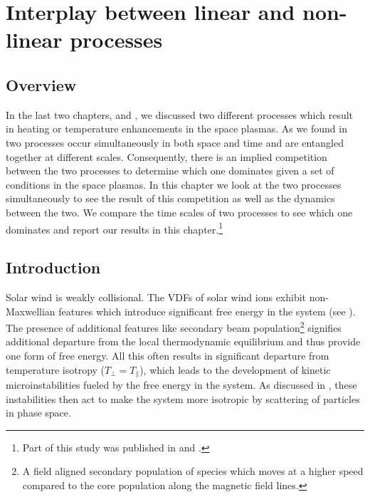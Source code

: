 %
%
\chapter{Interplay between linear and non-linear processes} \label{chap:chap7}

    \section{Overview} \label{sec:ovrvw7}

        In the last two chapters,  and , we discussed two
        different processes which result in heating or temperature enhancements in the space
        plasmas. As we found in  two processes occur simultaneously in both space
        and time and are entangled together at different scales. Consequently, there is an implied
        competition between the two processes to determine which one dominates given a set of
        conditions in the space plasmas. In this chapter we look at the two processes simultaneously
        to see the result of this competition as well as the dynamics between the two. We compare
        the time scales of two processes to see which one dominates and report our results in this
        chapter.\footnote{Part of this study was published in \citet{Bandyopadhyay2020b} and
        \citet{Gary2020}.}

    \section{Introduction} \label{sec:intr7}
    
        Solar wind is weakly collisional. The VDFs of solar wind ions exhibit non-Maxwellian
        features which introduce significant free energy in the system (see ). The
        presence of additional features like secondary beam population\footnote{A field aligned
        secondary population of species which moves at a higher speed compared to the core
        population along the magnetic field lines.} \citep[and references therein]{Verscharen2019}
        signifies additional departure from the  local thermodynamic equilibrium and thus provide
        one form of free energy. All this often results in significant departure from temperature
        isotropy ($T_{\perp} = T_{\parallel}$), which leads to the development of kinetic
        microinstabilities fueled by the free energy in the system. As discussed in
        , these instabilities then act to make the system more isotropic
        by scattering of particles in phase space.

